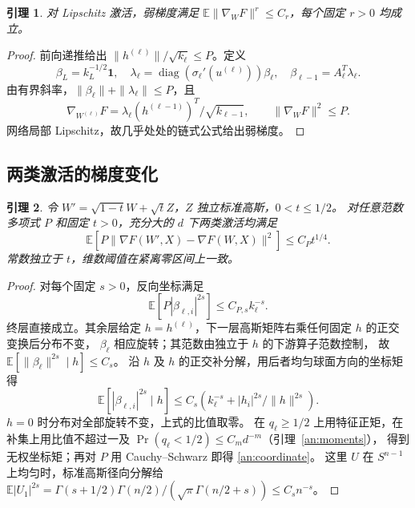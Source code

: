 \documentclass[a4paper]{tufte-handout}
\newtheorem{lemma}{引理}
\newcommand{\E}{\mathbb E}
\begin{document}
\begin{fullwidth}
\begin{lemma}\label{an:derivatives}
对 Lipschitz 激活，弱梯度满足 $\mathbb E\|\nabla_WF\|^r\le C_r$，每个固定 $r>0$ 均成立。
\end{lemma}
\begin{proof}
前向递推给出 $\|h^{(\ell)}\|/\sqrt{k_\ell}\le P$。定义
\[
 \beta_L=k_L^{-1/2}\boldsymbol1,\quad
 \lambda_\ell=\operatorname{diag}(\sigma_\ell'(u^{(\ell)}))\beta_\ell,\quad
 \beta_{\ell-1}=A_\ell^T\lambda_\ell.
\]
由有界斜率，$\|\beta_\ell\|+\|\lambda_\ell\|\le P$，且
\[
 \nabla_{W^{(\ell)}}F=\lambda_\ell(h^{(\ell-1)})^T/\sqrt{k_{\ell-1}},
 \qquad \|\nabla_WF\|^2\le P. \tag{A3}\label{an:gradient}
\]
网络局部 Lipschitz，故几乎处处的链式公式给出弱梯度。

\end{proof}
\subsection{两类激活的梯度变化}
\begin{lemma}\label{an:gradient-ou}
令 $W'=\sqrt{1-t}W+\sqrt tZ$，$Z$ 独立标准高斯，$0<t\le1/2$。
对任意范数多项式 $P$ 和固定 $t>0$，充分大的 $d$ 下两类激活均满足
\[
 \E[P\|\nabla F(W',X)-\nabla F(W,X)\|^2]
 \le C_Pt^{1/4}.
\]
常数独立于 $t$，维数阈值在紧离零区间上一致。
\end{lemma}
\begin{proof}
对每个固定 $s>0$，反向坐标满足
\begin{equation}\label{an:coordinate}
 \E[P|\beta_{\ell,i}|^{2s}]\le C_{P,s}k_\ell^{-s}.
\end{equation}
终层直接成立。其余层给定 $h=h^{(\ell)}$，下一层高斯矩阵右乘任何固定 $h$ 的正交变换后分布不变，
$\beta_\ell$ 相应旋转；其范数由独立于 $h$ 的下游算子范数控制，
故 $\E[\|\beta_\ell\|^{2s}\mid h]\le C_s$。
沿 $h$ 及 $h$ 的正交补分解，用后者均匀球面方向的坐标矩得
\[
 \E[|\beta_{\ell,i}|^{2s}\mid h]
 \le C_s\left(k_\ell^{-s}+|h_i|^{2s}/\|h\|^{2s}\right).
\]
$h=0$ 时分布对全部旋转不变，上式的比值取零。
在 $q_\ell\ge1/2$ 上用特征正矩，在补集上用比值不超过一及
$\Pr(q_\ell<1/2)\le C_md^{-m}$（引理~\ref{an:moments}），
得到无权坐标矩；再对 $P$ 用 Cauchy--Schwarz 即得 \eqref{an:coordinate}。
这里 $U$ 在 $S^{n-1}$ 上均匀时，标准高斯径向分解给
$\E|U_1|^{2s}=\Gamma(s+1/2)\Gamma(n/2)/(\sqrt\pi\Gamma(n/2+s))\le C_sn^{-s}$。


\end{proof}
\end{fullwidth}
\end{document}
